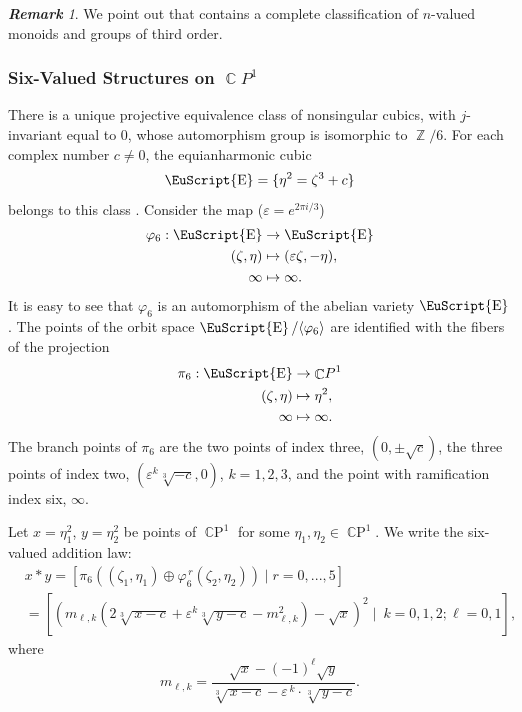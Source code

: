 \documentclass[14pt, dvipsnames]{extarticle}
\theoremstyle{plain}
\theoremstyle{definition}
\theoremstyle{remark}
\newtheorem{remark}{\bf Remark}
\let\phi\varphi
\DeclareMathOperator{\E}{\EuScript{E}}
\DeclareMathOperator{\Z}{\mathbb{Z}}
\DeclareMathOperator{\Cc}{\mathbb{C}}
\DeclareMathOperator{\CP}{\mathbb{C}P}
\renewcommand{\epsilon}{\varepsilon}
\begin{document}
\begin{remark}
We point out that \cite{K_class} contains a complete classification of $n$-valued monoids and groups of third order. 
\end{remark}








\subsubsection{Six-Valued Structures on $\Cc\!P^1$}
There is a unique projective equivalence class of nonsingular cubics, with $j$-invariant equal to $0$, whose automorphism group is isomorphic to $\Z/6$. For each complex number $c\neq 0$, the equianharmonic cubic
\begin{equation*}
\E = \{\eta^2 = \zeta^3 + c\}
\end{equation*}
belongs to this class \cite[Theorem 3.1.3]{Dolgachev}. Consider the map ($\epsilon = e^{2\pi i/3}$)
$$\begin{aligned}
\phi_6: \E&\to \E\\
(\zeta, \eta)&\mapsto (\epsilon \zeta, -\eta),\\
\infty&\mapsto\infty.
\end{aligned}$$
It is easy to see that $\phi_6$ is an automorphism of the abelian variety $\E$. The points of the orbit space $\E/\langle \phi_6 \rangle$ are identified with the fibers of the projection
$$\begin{aligned}
\pi_6: \E&\to \Cc\!P^1\\
(\zeta, \eta)&\mapsto \eta^2,\\
\infty&\mapsto\infty.
\end{aligned}$$
{The branch points of $\pi_6$ are the two points of index three, $(0,\pm\sqrt{c})$, the three points of index two, $(\epsilon^k\sqrt[3]{-c},0)$, $k=1,2,3$, and the point with ramification index six, $\infty$.}

Let $x = \eta_1^2$, $y = \eta_2^2$ be points of $\CP^1$ for some $\eta_1,\eta_2\in\CP^1$. We write the six-valued addition law:
\begin{equation}
\begin{aligned}\label{6_valued_law_multiset}
&x\ast y = [\pi_6((\zeta_1, \eta_1)\oplus \phi_6^{\, r}(\zeta_2, \eta_2))\mid r = 0, ..., 5] \\
&= \left[\left(m_{\ell, k}\left ( 2\sqrt[3]{\,x - c} + \epsilon^k\sqrt[3]{\,y - c} - m_{\ell, k}^2 \right ) - \sqrt{x}\right)^2\mid \ k = 0, 1, 2; \ell = 0, 1\right],
\end{aligned}
\end{equation}
where
$$m_{\ell, k} = \frac{\sqrt{x} - (-1)^{\ell}\sqrt{y}}{\sqrt[3]{\,x - c} - \epsilon^{\, k}\cdot\sqrt[3]{\,y - c}}.$$
\end{document}
